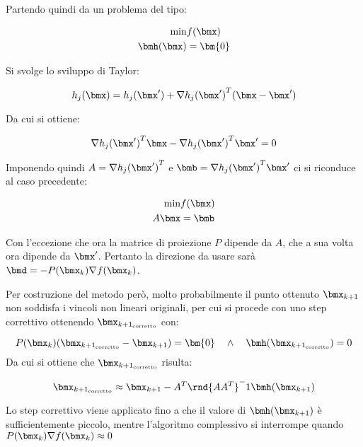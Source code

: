 \documentclass[\main/main.tex]{subfiles}
\begin{document}
Partendo quindi da un problema del tipo:

\begin{align*}
    \min &f(\bmx)\\
    \bmh(\bmx) &= \bm{0}
\end{align*}

Si svolge lo sviluppo di Taylor:

\[
    h_j(\bmx) = h_j(\bmx') + \nabla {h_j(\bmx')}^T(\bmx-\bmx')
\]

Da cui si ottiene:

\[
    \nabla {h_j(\bmx')}^T\bmx - \nabla {h_j(\bmx')}^T\bmx' = 0
\]

Imponendo quindi \(A = \nabla {h_j(\bmx')}^T\) e \(\bmb = \nabla {h_j(\bmx')}^T\bmx'\) ci si riconduce al caso precedente:

\begin{align*}
    \min &f(\bmx)\\
    A\bmx &= \bmb
\end{align*}

Con l'eccezione che ora la matrice di proiezione \(P\) dipende da \(A\), che a sua volta ora dipende da \(\bmx'\). Pertanto la direzione da usare sarà \(\bmd = -P(\bmx_k)\nabla f(\bmx_k)\).

Per costruzione del metodo però, molto probabilmente il punto ottenuto \(\bmx_{k+1}\) non soddisfa i vincoli non lineari originali, per cui si procede con uno step correttivo ottenendo \(\bmx_{{k+1}_{\text{corretto}}}\) con:

\[
    P(\bmx_k)(\bmx_{{k+1}_{\text{corretto}}}-\bmx_{k+1}) = \bm{0} \quad \land \quad \bmh(\bmx_{{k+1}_{\text{corretto}}}) = 0
\]
Da cui si ottiene che \(\bmx_{{k+1}_{\text{corretto}}}\) risulta:

\[
    \bmx_{{k+1}_{\text{corretto}}} \approx \bmx_{k+1} - A^T\rnd{AA^T}^-1 \bmh(\bmx_{k+1})
\]

Lo step correttivo viene applicato fino a che il valore di \(\bmh(\bmx_{k+1})\) è sufficientemente piccolo, mentre l'algoritmo complessivo si interrompe quando \(P(\bmx_k)\nabla f(\bmx_k) \approx 0\)
\end{document}
